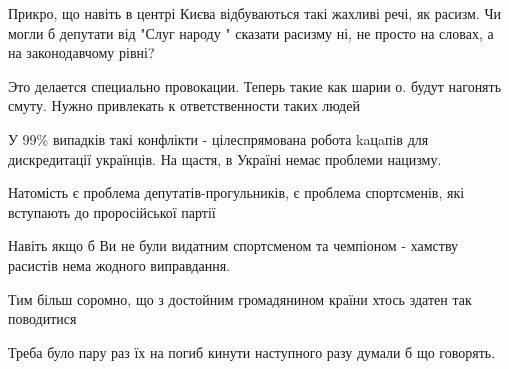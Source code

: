 \begin{itemize}
Прикро, що навіть в центрі Києва відбуваються такі жахливі речі, як расизм. Чи
могли б депутати від "Слуг народу " сказати расизму ні, не просто на словах, а
на законодавчому рівні?


 
Это делается специально провокации. Теперь такие как шарии о. будут нагонять
смуту. Нужно привлекать к ответственности таких людей

 

У 99\% випадків такі конфлікти - цілеспрямована робота kaцaпiв для дискредитації
українців. На щастя, в Україні немає проблеми нацизму.

Натомість є проблема депутатів-прогульників, є проблема спортсменів, які
вступають до проросійської партії


 

Навіть якщо б Ви не були видатним спортсменом та чемпіоном - хамству расистів
нема жодного виправдання.

Тим більш соромно, що з достойним громадянином країни хтось здатен так
поводитися


 

Треба було пару раз їх на погиб кинути наступного разу думали б що говорять.

 


\end{itemize}
